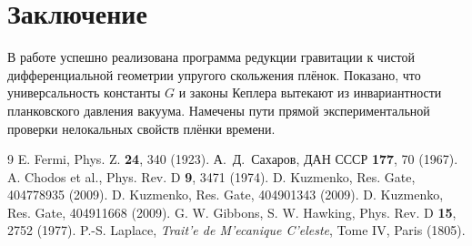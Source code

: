 \documentclass[12pt,a4paper]{article}
\begin{document}
\section{Заключение}  
В работе успешно реализована программа редукции гравитации к чистой дифференциальной геометрии упругого скольжения плёнок. Показано, что универсальность константы $G$ и законы Кеплера вытекают из инвариантности планковского давления вакуума. Намечены пути прямой экспериментальной проверки нелокальных свойств плёнки времени.

\begin{thebibliography}{9}  
 E. Fermi, Phys. Z. {\bf 24}, 340 (1923).  
 А.~Д.~Сахаров, ДАН СССР {\bf 177}, 70 (1967).  
 A. Chodos et al., Phys. Rev. D {\bf 9}, 3471 (1974).  
 D. Kuzmenko, Res. Gate, 404778935 (2009).  
 D. Kuzmenko, Res. Gate, 404901343 (2009).  
 D. Kuzmenko, Res. Gate, 404911668 (2009).  
 G. W. Gibbons, S. W. Hawking, Phys. Rev. D {\bf 15}, 2752 (1977).  
 P.-S. Laplace, {\it Trait'e de M'ecanique C'eleste}, Tome IV, Paris (1805).  
\end{thebibliography}
\end{document}
